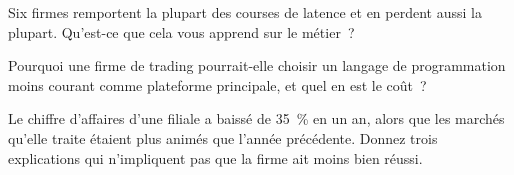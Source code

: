 \begin{interviewq}\label{iq:in:proprietary-market-makers-and-high-frequency-firms:4}
Six firmes remportent la plupart des courses de latence et en perdent aussi la plupart. Qu'est-ce que cela vous apprend sur le métier~?
\end{interviewq}

\begin{interviewq}\label{iq:in:proprietary-market-makers-and-high-frequency-firms:5}
Pourquoi une firme de trading pourrait-elle choisir un langage de programmation moins courant comme plateforme principale, et quel en est le coût~?
\end{interviewq}

\begin{interviewq}\label{iq:in:proprietary-market-makers-and-high-frequency-firms:6}
Le chiffre d'affaires d'une filiale a baissé de 35~\% en un an, alors que les marchés qu'elle traite étaient plus animés que l'année précédente. Donnez trois
explications qui n'impliquent pas que la firme ait moins bien réussi.
\end{interviewq}
